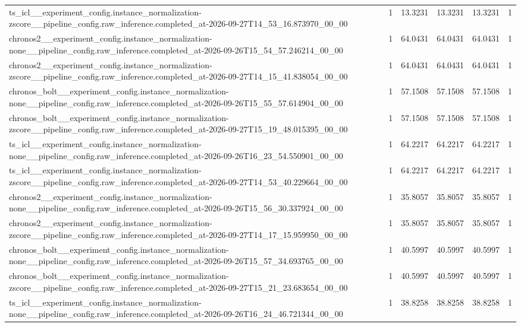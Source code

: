 \begin{tabular}{llllll}
ts\_icl\_\_experiment\_config.instance\_normalization-zscore\_\_pipeline\_config.raw\_inference.completed\_at-2026-09-27T14\_53\_16.873970\_00\_00 & 1 & 13.3231 & 13.3231 & 13.3231 & 1 \\
chronos2\_\_experiment\_config.instance\_normalization-none\_\_pipeline\_config.raw\_inference.completed\_at-2026-09-26T15\_54\_57.246214\_00\_00 & 1 & 64.0431 & 64.0431 & 64.0431 & 1 \\
chronos2\_\_experiment\_config.instance\_normalization-zscore\_\_pipeline\_config.raw\_inference.completed\_at-2026-09-27T14\_15\_41.838054\_00\_00 & 1 & 64.0431 & 64.0431 & 64.0431 & 1 \\
chronos\_bolt\_\_experiment\_config.instance\_normalization-none\_\_pipeline\_config.raw\_inference.completed\_at-2026-09-26T15\_55\_57.614904\_00\_00 & 1 & 57.1508 & 57.1508 & 57.1508 & 1 \\
chronos\_bolt\_\_experiment\_config.instance\_normalization-zscore\_\_pipeline\_config.raw\_inference.completed\_at-2026-09-27T15\_19\_48.015395\_00\_00 & 1 & 57.1508 & 57.1508 & 57.1508 & 1 \\
ts\_icl\_\_experiment\_config.instance\_normalization-none\_\_pipeline\_config.raw\_inference.completed\_at-2026-09-26T16\_23\_54.550901\_00\_00 & 1 & 64.2217 & 64.2217 & 64.2217 & 1 \\
ts\_icl\_\_experiment\_config.instance\_normalization-zscore\_\_pipeline\_config.raw\_inference.completed\_at-2026-09-27T14\_53\_40.229664\_00\_00 & 1 & 64.2217 & 64.2217 & 64.2217 & 1 \\
chronos2\_\_experiment\_config.instance\_normalization-none\_\_pipeline\_config.raw\_inference.completed\_at-2026-09-26T15\_56\_30.337924\_00\_00 & 1 & 35.8057 & 35.8057 & 35.8057 & 1 \\
chronos2\_\_experiment\_config.instance\_normalization-zscore\_\_pipeline\_config.raw\_inference.completed\_at-2026-09-27T14\_17\_15.959950\_00\_00 & 1 & 35.8057 & 35.8057 & 35.8057 & 1 \\
chronos\_bolt\_\_experiment\_config.instance\_normalization-none\_\_pipeline\_config.raw\_inference.completed\_at-2026-09-26T15\_57\_34.693765\_00\_00 & 1 & 40.5997 & 40.5997 & 40.5997 & 1 \\
chronos\_bolt\_\_experiment\_config.instance\_normalization-zscore\_\_pipeline\_config.raw\_inference.completed\_at-2026-09-27T15\_21\_23.683654\_00\_00 & 1 & 40.5997 & 40.5997 & 40.5997 & 1 \\
ts\_icl\_\_experiment\_config.instance\_normalization-none\_\_pipeline\_config.raw\_inference.completed\_at-2026-09-26T16\_24\_46.721344\_00\_00 & 1 & 38.8258 & 38.8258 & 38.8258 & 1 \\

\end{tabular}
